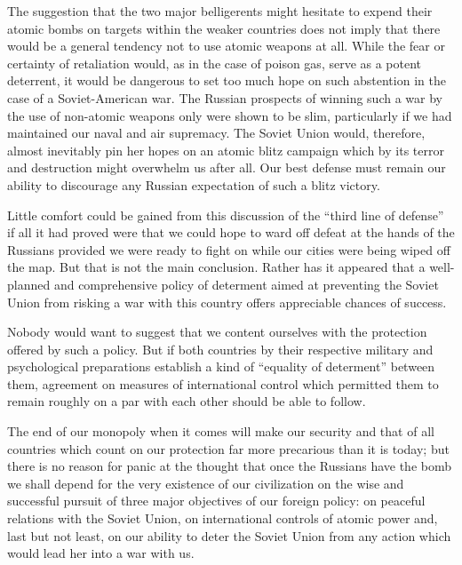 The suggestion that the two major belligerents might hesitate to expend their atomic bombs on targets within the weaker countries does not imply that there would be a general tendency not to use atomic weapons at all. While the fear or certainty of retaliation would, as in the case of poison gas, serve as a potent deterrent, it would be dangerous to set too much hope on such abstention in the case of a Soviet-American war. The Russian prospects of winning such a war by the use of non-atomic weapons only were shown to be slim, particularly if we had maintained our naval and air supremacy. The Soviet Union would, therefore, almost inevitably pin her hopes on an atomic blitz campaign which by its terror and destruction might overwhelm us after all. Our best defense must remain our ability to discourage any Russian expectation of such a blitz victory.

Little comfort could be gained from this discussion of the ``third line of defense'' if all it had proved were that we could hope to ward off defeat at the hands of the Russians provided we were ready to fight on while our cities were being wiped off the map. But that is not the main conclusion. Rather has it appeared that a well-planned and comprehensive policy of determent aimed at preventing the Soviet Union from risking a war with this country offers appreciable chances of success.

Nobody would want to suggest that we content ourselves with the protection offered by such a policy. But if both countries by their respective military and psychological preparations establish a kind of ``equality of determent'' between them, agreement on measures of international control which permitted them to remain roughly on a par with each other should be able to follow.

The end of our monopoly when it comes will make our security and that of all countries which count on our protection far more precarious than it is today; but there is no reason for panic at the thought that once the Russians have the bomb we shall depend for the very existence of our civilization on the wise and successful pursuit of three major objectives of our foreign policy: on peaceful relations with the Soviet Union, on international controls of atomic power and, last but not least, on our ability to deter the Soviet Union from any action which would lead her into a war with us.
